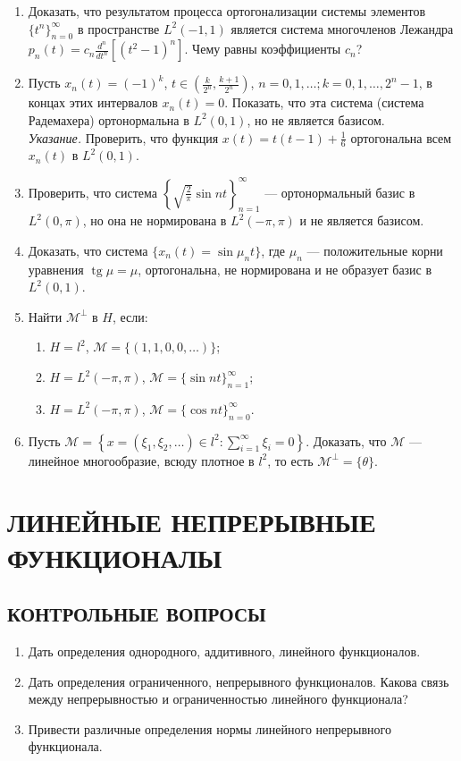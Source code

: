 \documentclass[12pt,a4paper]{article}
\begin{document}
\begin{enumerate}
\item Доказать, что результатом процесса ортогонализации системы элементов $\{t^{n}\}_{n=0}^{\infty}$ в пространстве $L^{2}(-1,1)$ является система многочленов Лежандра $p_{n}(t)=c_{n}\frac{d^{n}}{dt^{n}}[(t^{2}-1)^{n}]$. Чему равны коэффициенты $c_{n}$?
\item Пусть $x_{n}(t)=(-1)^{k}$, $t\in\left(\frac{k}{2^{n}},\frac{k+1}{2^{n}}\right)$, $n=0,1,\dots; k=0,1,\dots,2^{n}-1$, в концах этих интервалов $x_{n}(t)=0$. Показать, что эта система (система Радемахера) ортонормальна в $L^{2}(0,1)$, но не является базисом.\\
\textit{Указание.} Проверить, что функция $x(t)=t(t-1)+\frac{1}{6}$ ортогональна всем $x_{n}(t)$ в $L^{2}(0,1)$.
\item Проверить, что система $\left\{\sqrt{\frac{2}{\pi}}\sin nt\right\}_{n=1}^{\infty}$ — ортонормальный базис в $L^{2}(0,\pi)$, но она не нормирована в $L^{2}(-\pi,\pi)$ и не является базисом.
\item Доказать, что система $\{x_{n}(t)=\sin \mu_{n}t\}$, где $\mu_{n}$ — положительные корни уравнения $\operatorname{tg} \mu=\mu$, ортогональна, не нормирована и не образует базис в $L^{2}(0,1)$.
\item Найти $\mathcal{M}^{\perp}$ в $H$, если:
\begin{enumerate}[label=\alph*)]
\item $H=l^{2}$, $\mathcal{M}=\{(1,1,0,0,\dots)\}$;
\item $H=L^{2}(-\pi,\pi)$, $\mathcal{M}=\{\sin nt\}_{n=1}^{\infty}$;
\item $H=L^{2}(-\pi,\pi)$, $\mathcal{M}=\{\cos nt\}_{n=0}^{\infty}$.
\end{enumerate}
\item Пусть $\mathcal{M}=\left\{x=(\xi_{1},\xi_{2},\dots)\in l^{2} : \sum_{i=1}^{\infty}\xi_{i}=0\right\}$. Доказать, что $\mathcal{M}$ — линейное многообразие, всюду плотное в $l^{2}$, то есть $\mathcal{M}^{\perp}=\{\theta\}$.
\end{enumerate}

\section{ЛИНЕЙНЫЕ НЕПРЕРЫВНЫЕ ФУНКЦИОНАЛЫ}

\subsection*{КОНТРОЛЬНЫЕ ВОПРОСЫ}
\begin{enumerate}
\item Дать определения однородного, аддитивного, линейного функционалов.
\item Дать определения ограниченного, непрерывного функционалов. Какова связь между непрерывностью и ограниченностью линейного функционала?
\item Привести различные определения нормы линейного непрерывного функционала.
\end{enumerate}
\end{document}
